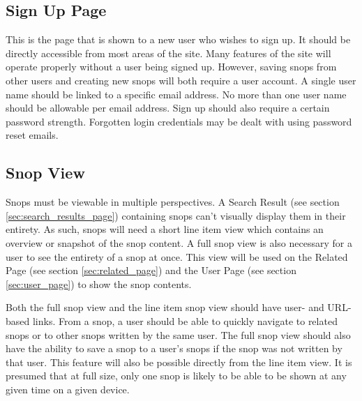 \documentclass[11pt]{article}
\begin{document}
\subsection{Sign Up Page}
This is the page that is shown to a new user who wishes to sign up. It should be directly accessible from most areas of the site. Many features of the site will operate properly without a user being signed up. However, saving snops from other users and creating new snops will both require a user account. A single user name should be linked to a specific email address. No more than one user name should be allowable per email address. Sign up should also require a certain password strength. Forgotten login credentials may be dealt with using password reset emails.
\subsection{Snop View}
Snops must be viewable in multiple perspectives. A Search Result (see section \ref{sec:search_results_page}) containing snops can't visually display them in their entirety. As such, snops will need a short line item view which contains an overview or snapshot of the snop content. A full snop view is also necessary for a user to see the entirety of a snop at once. This view will be used on the Related Page (see section \ref{sec:related_page}) and the User Page (see section \ref{sec:user_page}) to show the snop contents. 

Both the full snop view and the line item snop view should have user- and URL-based links. From a snop, a user should be able to quickly navigate to related snops or to other snops written by the same user. The full snop view should also have the ability to save a snop to a user's snops if the snop was not written by that user. This feature will also be possible directly from the line item view. It is presumed that at full size, only one snop is likely to be able to be shown at any given time on a given device.
\end{document}

